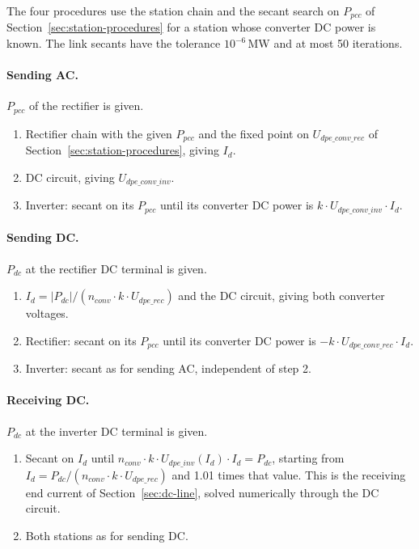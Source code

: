 The four procedures use the station chain and the secant search on $P_{pcc}$ of
Section~\ref{sec:station-procedures} for a station whose converter DC power is known. The link secants have the
tolerance $10^{-6}$\,MW and at most 50 iterations.

\paragraph{Sending AC.} $P_{pcc}$ of the rectifier is given.
\begin{enumerate}
  \item Rectifier chain with the given $P_{pcc}$ and the fixed point on $U_{dpe\_conv\_rec}$ of
        Section~\ref{sec:station-procedures}, giving $I_d$.
  \item DC circuit, giving $U_{dpe\_conv\_inv}$.
  \item Inverter: secant on its $P_{pcc}$ until its converter DC power is $k \cdot U_{dpe\_conv\_inv} \cdot I_d$.
\end{enumerate}

\paragraph{Sending DC.} $P_{dc}$ at the rectifier DC terminal is given.
\begin{enumerate}
  \item $I_d = |P_{dc}| / (n_{conv} \cdot k \cdot U_{dpe\_rec})$ and the DC circuit, giving both converter voltages.
  \item Rectifier: secant on its $P_{pcc}$ until its converter DC power is $-k \cdot U_{dpe\_conv\_rec} \cdot I_d$.
  \item Inverter: secant as for sending AC, independent of step 2.
\end{enumerate}

\paragraph{Receiving DC.} $P_{dc}$ at the inverter DC terminal is given.
\begin{enumerate}
  \item Secant on $I_d$ until $n_{conv} \cdot k \cdot U_{dpe\_inv}(I_d) \cdot I_d = P_{dc}$, starting from
        $I_d = P_{dc} / (n_{conv} \cdot k \cdot U_{dpe\_rec})$ and 1.01 times that value. This is the receiving end
        current of Section~\ref{sec:dc-line}, solved numerically through the DC circuit.
  \item Both stations as for sending DC.
\end{enumerate}

